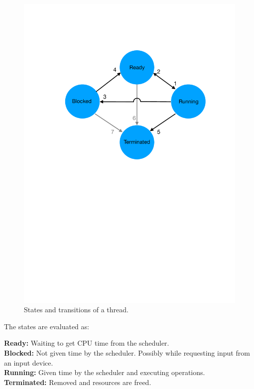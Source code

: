 \begin{figure}[H]
    \centering
    \includegraphics[width=0.9\linewidth]{ThreadStates.pdf}
    \caption{States and transitions of a thread.}
    \label{fig:threadstates}
\end{figure}

The states are evaluated as:

\textbf{Ready:} Waiting to get CPU time from the scheduler.\\
\textbf{Blocked:} Not given time by the scheduler. Possibly while requesting input from an input device.\\
\textbf{Running:} Given time by the scheduler and executing operations.\\
\textbf{Terminated:} Removed and resources are freed.\\


